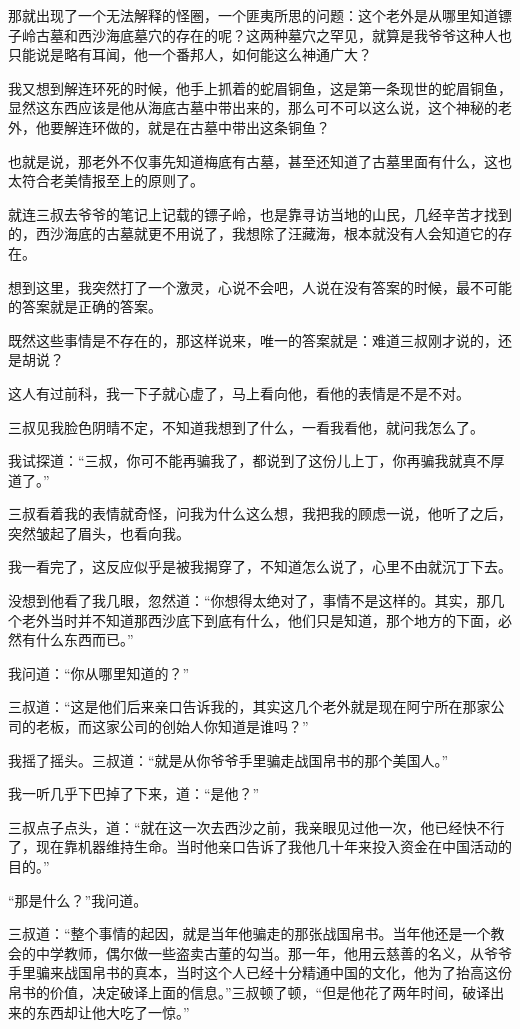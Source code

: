 那就出现了一个无法解释的怪圈，一个匪夷所思的问题：这个老外是从哪里知道镖子岭古墓和西沙海底墓穴的存在的呢？这两种墓穴之罕见，就算是我爷爷这种人也只能说是略有耳闻，他一个番邦人，如何能这么神通广大？

我又想到解连环死的时候，他手上抓着的蛇眉铜鱼，这是第一条现世的蛇眉铜鱼，显然这东西应该是他从海底古墓中带出来的，那么可不可以这么说，这个神秘的老外，他要解连环做的，就是在古墓中带出这条铜鱼？

也就是说，那老外不仅事先知道梅底有古墓，甚至还知道了古墓里面有什么，这也太符合老美情报至上的原则了。

就连三叔去爷爷的笔记上记载的镖子岭，也是靠寻访当地的山民，几经辛苦才找到的，西沙海底的古墓就更不用说了，我想除了汪藏海，根本就没有人会知道它的存在。

想到这里，我突然打了一个激灵，心说不会吧，人说在没有答案的时候，最不可能的答案就是正确的答案。

既然这些事情是不存在的，那这样说来，唯一的答案就是：难道三叔刚才说的，还是胡说？

这人有过前科，我一下子就心虚了，马上看向他，看他的表情是不是不对。

三叔见我脸色阴晴不定，不知道我想到了什么，一看我看他，就问我怎么了。

我试探道：“三叔，你可不能再骗我了，都说到了这份儿上丁，你再骗我就真不厚道了。”

三叔看着我的表情就奇怪，问我为什么这么想，我把我的顾虑一说，他听了之后，突然皱起了眉头，也看向我。

我一看完了，这反应似乎是被我揭穿了，不知道怎么说了，心里不由就沉丁下去。

没想到他看了我几眼，忽然道：“你想得太绝对了，事情不是这样的。其实，那几个老外当时并不知道那西沙底下到底有什么，他们只是知道，那个地方的下面，必然有什么东西而已。”

我问道：“你从哪里知道的？”

三叔道：“这是他们后来亲口告诉我的，其实这几个老外就是现在阿宁所在那家公司的老板，而这家公司的创始人你知道是谁吗？”

我摇了摇头。三叔道：“就是从你爷爷手里骗走战国帛书的那个美国人。”

我一听几乎下巴掉了下来，道：“是他？”

三叔点子点头，道：“就在这一次去西沙之前，我亲眼见过他一次，他已经快不行了，现在靠机器维持生命。当时他亲口告诉了我他几十年来投入资金在中国活动的目的。”

“那是什么？”我问道。

三叔道：“整个事情的起因，就是当年他骗走的那张战国帛书。当年他还是一个教会的中学教师，偶尔做一些盗卖古董的勾当。那一年，他用云慈善的名义，从爷爷手里骗来战国帛书的真本，当时这个人已经十分精通中国的文化，他为了抬高这份帛书的价值，决定破译上面的信息。”三叔顿了顿，“但是他花了两年时间，破译出来的东西却让他大吃了一惊。”

